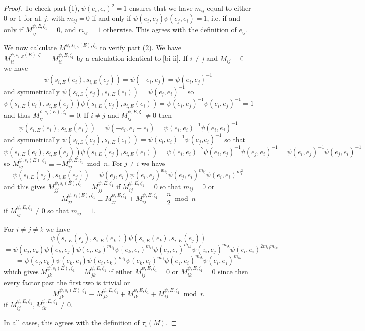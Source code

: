 \documentclass[11pt,letterpaper]{article}
\theoremstyle{definition}
\theoremstyle{remark}
\numberwithin{equation}{section}
\theoremstyle{dotless}
\newcommand{\hchi}{\psi} %
\newcommand{\gene}{\zeta_1} %
\begin{document}
\begin{proof}To check part (1), $\psi(e_i,e_i)^2=1$ ensures that we have $m_{ij}$ equal to either $0$ or $1$ for all $j$, with $m_{ij}=0$ if and only if $\hchi(e_i,e_j)\hchi(e_j,e_i)=1$, i.e. if and only if $M_{ij}^{\hchi,E,\gene} =0$, and $m_{ij}=1$ otherwise. This agrees with the definition of $e_{ij}$.

We now calculate $M^{\hchi,s_{i,E}(E) , \gene}$ to verify part (2). We have $M_{ii}^{\hchi,s_{i,E}(E) , \gene}=M_{ii}^{\hchi,E, \gene}$ by a calculation identical to \eqref{bi-ii}. If $i\neq j$ and $M_{ij}=0$ we have
\[ \hchi( s_{i,E}(e_i), s_{i,E} (e_j))= \hchi(-e_i, e_j )= \hchi(e_i,e_j)^{-1}  \] 
and symmetrically $ \hchi( s_{i,E}(e_j), s_{i,E} (e_i))=\hchi(e_j,e_i)^{-1}$ so
\[ \hchi( s_{i,E}(e_i), s_{i,E} (e_j)) \hchi( s_{i,E}(e_j), s_{i,E} (e_i)) = \hchi(e_i,e_j)^{-1}\hchi(e_i,e_j)^{-1} =1\] and thus $M^{\hchi,s_i(E),\gene}_{ij}=0$.
If $i\neq j$ and $M_{ij}^{\hchi,E,\gene} \neq 0$ then 
\[ \hchi( s_{i,E}(e_i), s_{i,E} (e_j))= \hchi(-e_i, e_j +e_i) = \hchi(e_i,e_i)^{-1} \hchi(e_i,e_j)^{-1} \]
and symmetrically $\hchi( s_{i,E}(e_j), s_{i,E} (e_i))= \hchi(e_i,e_i)^{-1} \hchi(e_j,e_i)^{-1}$ so that
\[ \hchi( s_{i,E}(e_i), s_{i,E} (e_j)) \hchi( s_{i,E}(e_j), s_{i,E} (e_i)) = \hchi(e_i,e_i)^{-2}  \hchi(e_i,e_j)^{-1}\hchi(e_j,e_i)^{-1}=\hchi(e_i,e_j)^{-1}\hchi(e_j,e_i)^{-1}\]
so $M^{\hchi,s_i(E),\gene}_{ij} \equiv - M_{ij}^{\hchi,E,\gene}\bmod n$. For $j \neq i$ we have
\[  \hchi( s_{i,E}(e_j), s_{i,E} (e_j)) =\hchi(e_j,e_j) \hchi(e_i,e_j)^{m_{ij} }\hchi(e_j,e_i)^{m_{ij}} \hchi(e_i,e_i)^{m_{ij}^2}\]
and this gives $M^{\hchi,s_i(E),\gene}_{jj} = M_{jj}^{\hchi,E,\gene}$ if $M_{ij}^{\hchi,E,\gene}=0$ so that $m_{ij}=0$ or  $$M^{\hchi,s_i(E),\gene}_{jj}  \equiv M_{jj}^{\hchi,E,\gene} + M_{ij}^{\hchi,E,\gene}+ \frac{n}{2} \bmod n $$ if $M_{ij}^{\hchi,E,\gene}\neq 0$ so that $m_{ij}=1$.

For $i \neq j \neq k$ we have 
\[ \hchi( s_{i,E}(e_j), s_{i,E} (e_k))\hchi( s_{i,E}(e_k), s_{i,E} (e_j))\] \[=\hchi(e_j,e_k)  \hchi(e_k,e_j) \hchi(e_i,e_k)^{m_{ij} }  \hchi(e_k,e_i)^{m_{ij} } \hchi(e_j,e_i)^{m_{ik}} \hchi(e_i,e_j)^{m_{ik} }\hchi(e_i,e_i)^{2m_{ij}m_{ik}} \]
\[=\hchi(e_j,e_k)  \hchi(e_k,e_j) \hchi(e_i,e_k)^{m_{ij} }  \hchi(e_k,e_i)^{m_{ij} } \hchi(e_j,e_i)^{m_{ik}} \hchi(e_i,e_j)^{m_{ik}} \]
which gives $M^{\hchi,s_i(E),\gene}_{jk} = M_{jk}^{\hchi,E,\gene}$ if either $M_{ij}^{\hchi,E,\gene}=0$ or $M_{ik}^{\hchi,E,\gene}=0$ since then every factor past the first two is trivial or 
\[M^{\hchi,s_i(E),\gene}_{jk} \equiv  M_{jk}^{\hchi,E,\gene}+  M_{ik}^{\hchi,E,\gene}+  M_{ij}^{\hchi,E,\gene} \bmod n \] if $M_{ij}^{\hchi,E,\gene},M_{ik}^{\hchi,E,\gene}\neq 0$.

In all cases, this agrees with the definition of $\tau_i(M)$.\end{proof}
\end{document}
